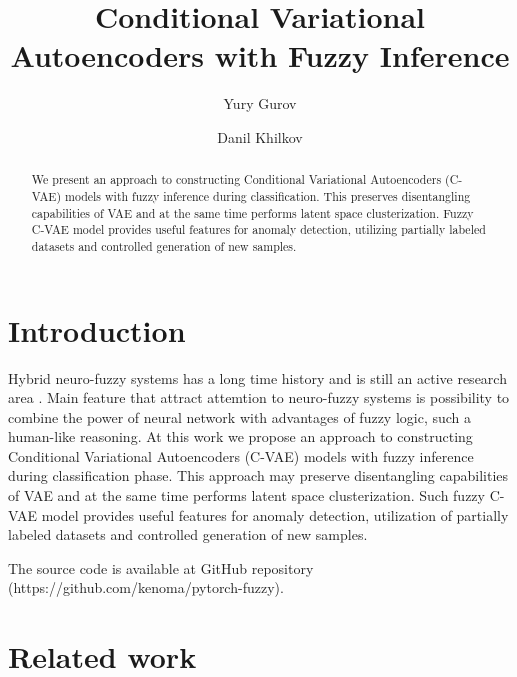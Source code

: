 \documentclass[runningheads]{llncs}
\begin{document}
%
\title{Conditional Variational Autoencoders with Fuzzy Inference}
%
\author{Yury Gurov \and
Danil Khilkov}
%
%
\maketitle              %
%
\begin{abstract}
We present an approach to constructing Conditional Variational Autoencoders (C-VAE) models with fuzzy inference during classification.
This preserves disentangling capabilities of VAE and at the same time performs latent space clusterization.
Fuzzy C-VAE model provides useful features for anomaly detection, utilizing partially labeled datasets and controlled generation of new samples.
%
\end{abstract}
%
%
%
\section{Introduction}

Hybrid neuro-fuzzy systems has a long time history and is still an active research area \cite{DECAMPOSSOUZA2020106275}.
Main feature that attract attemtion to neuro-fuzzy systems is possibility to combine the power of neural network with advantages of fuzzy logic, such a human-like reasoning.
At this work we propose an approach to constructing Conditional Variational Autoencoders (C-VAE) \cite{kingma2022autoencoding,Kingma_2019,SohnCVAE} models with fuzzy inference during classification phase.
This approach may preserve disentangling capabilities of VAE and at the same time performs latent space clusterization.
Such fuzzy C-VAE model provides useful features for anomaly detection, utilization of partially labeled datasets and controlled generation of new samples.

The source code is available at GitHub repository (https://github.com/kenoma/pytorch-fuzzy).

\section{Related work}
\end{document}
